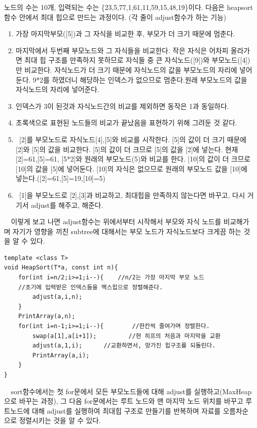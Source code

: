 \documentclass[a4paper,11pt]{article}
\begin{document}
노드의 수는 10개, 입력되는 수는 \{23,5,77,1,61,11,59,15,48,19\}이다.
다음은 heapsort함수 안에서 최대 힙으로 만드는 과정이다. (각 줄이 adjust함수가 하는 기능)
\begin{enumerate}
\item 가장 마지막부모([5])과 그 자식을 비교한 후, 부모가 더 크기 때문에 멈춘다.
\item 마지막에서 두번째 부모노드와 그 자식들을 비교한다. 작은 자식은 어차피 올라가면 최대 힙 구조를 만족하지 못하므로 자식들 중 큰 자식노드([9])와 부모노드([4])만 비교한다. 자식노드가 더 크기 때문에 자식노드의 값을 부모노드의 자리에 넣어둔다. 9*2를 하였더니 해당하는 인덱스가 없으므로 멈춘다.원래 부모노드의 값을 자식노드의 자리에 넣어준다.
\item 인덱스가 3이 된것과 자식노드간의 비교를 제외하면 동작은 1과 동일하다.
\item 초록색으로 표현된 노드들의 비교가 끝났음을 표현하기 위해 그려둔 것 같다.
\item \ [2]를 부모노드로 자식노드[4],[5]와 비교를 시작한다. [5]의 값이 더 크기 때문에 [2]와 [5]의 값을 비교한다. [5]의 값이 더 크므로 [5]의 값을 [2]에 넣는다. 현재[2]=61,[5]=61, [5*2]와 원래의 부모노드(5)와 비교를 한다. [10]의 값이 더 크므로 [10]의 값을 [5]에 넣어둔다. [10]의 자식은 없으므로 원래의 부모노드 값을 [10]에 넣는다.([2]=61,[5]=19,[10]=5)
\item \ [1]을 부모노드로 [2],[3]과 비교하고, 최대힙을 만족하지 않는다면 바꾸고, 다시 거기서 adjust를 해주고, 해준다.
\end{enumerate}
\ \ 이렇게 보고 나면 adjust함수는 위에서부터 시작해서 부모와 자식 노드를 비교해가며 자기가 영향을 끼친 subtree에 대해서는 부모 노드가 자식노드보다 크게끔 하는 것을 알 수 있다. 
\begin{Verbatim}
template <class T>
void HeapSort(T*a, const int n){
    for(int i=n/2;i>=1;i--){    //n/2는 가장 마지막 부모 노드
    //초기에 입력받은 인덱스들을 맥스힙으로 정렬해준다.
        adjust(a,i,n);
    }
    PrintArray(a,n);
    for(int i=n-1;i>=1;i--){        //한칸씩 줄여가며 정렬한다.
        swap(a[1],a[i+1]);         //현 히프의 처음과 마지막을 교환
        adjust(a,1,i);      //교환하면서, 망가진 힙구조를 되돌린다.
        PrintArray(a,i);
    }
}
\end{Verbatim} 
\ \ sort함수에서는 첫 for문에서 모든 부모노드들에 대해 adjust를 실행하고(MaxHeap으로 바꾸는 과정), 그 다음 for문에서는 루트 노드와 맨 마지막 노드 위치를 바꾸고 루트노드에 대해 adjust를 실행하여 최대힙 구조로 만들기를 반복하며 자료를 오름차순으로 정렬시키는 것을 알 수 있다.
\end{document}
